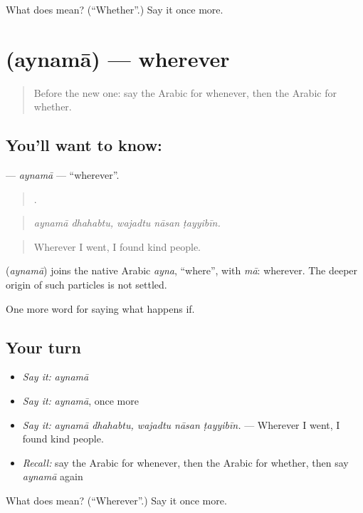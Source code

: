 \begin{tcolorbox}[breakable,colback=teal!4,colframe=teal!35!black,title={Before you move on}]
What does  mean? (\textquotedblleft{}Whether\textquotedblright{}.) Say it once more.
\end{tcolorbox}
\section[\texorpdfstring{\ar{أينما} (aynamā)}{أينما (aynamā)}]{ (aynamā) — wherever}

\label{lesson:AR-C400-aynama}



\begin{quote}
Before the new one: say the Arabic for whenever, then the Arabic for whether.
\end{quote}

\subsection*{You'll want to know: }
\textbf{} — \emph{aynamā} — \textquotedblleft{}wherever\textquotedblright{}.

\begin{quote}
    .
\end{quote}

\begin{quote}
\emph{aynamā dhahabtu, wajadtu nāsan ṭayyibīn.}
\end{quote}

\begin{quote}
Wherever I went, I found kind people.
\end{quote}

\begin{cousinweb}
\textbf{} (\emph{aynamā}) joins the native Arabic \emph{ayna}, \textquotedblleft{}where\textquotedblright{}, with \emph{mā}: wherever. The deeper origin of such particles is not settled.
\end{cousinweb}

\begin{grammarlens}[title={What you've built}]
One more word for saying what happens if.
\end{grammarlens}

\subsection*{Your turn}
\begin{itemize}
\raggedright
  \item \emph{Say it:} \emph{aynamā}
  \item \emph{Say it:} \emph{aynamā}, once more
  \item \emph{Say it:} \emph{aynamā dhahabtu, wajadtu nāsan ṭayyibīn.} — Wherever I went, I found kind people.
  \item \emph{Recall:} say the Arabic for whenever, then the Arabic for whether, then say \emph{aynamā} again
\end{itemize}

\begin{tcolorbox}[breakable,colback=teal!4,colframe=teal!35!black,title={Before you move on}]
What does  mean? (\textquotedblleft{}Wherever\textquotedblright{}.) Say it once more.
\end{tcolorbox}
